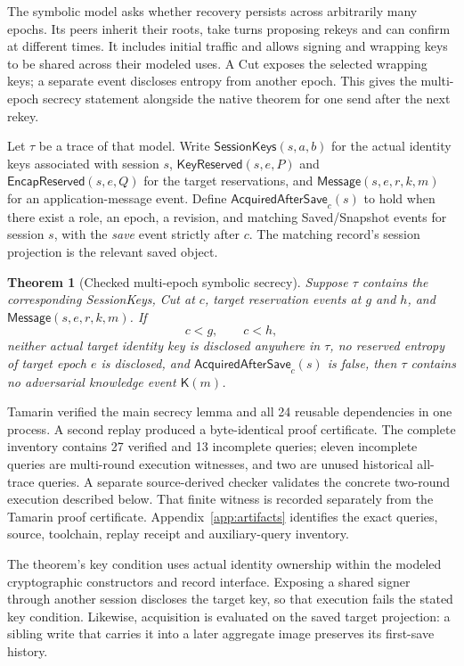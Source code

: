 \documentclass[pdflatex]{sn-jnl}
\theoremstyle{thmstyleone}
\newtheorem{theorem}{Theorem}[section]
\theoremstyle{thmstylethree}
\theoremstyle{thmstyletwo}
\begin{document}
The symbolic model asks whether recovery persists across arbitrarily
many epochs. Its peers inherit their roots, take turns proposing rekeys
and can confirm at different times. It includes initial traffic and
allows signing and wrapping keys to be shared across their modeled
uses. A \textsf{Cut} exposes the selected wrapping keys; a separate
event discloses entropy from another epoch. This gives the multi-epoch
secrecy statement alongside the native theorem for one send after the
next rekey.

Let $\tau$ be a trace of that model. Write
$\mathsf{SessionKeys}(s,a,b)$ for the actual identity keys associated with session
$s$, $\mathsf{KeyReserved}(s,e,P)$ and $\mathsf{EncapReserved}(s,e,Q)$ for the
target reservations, and $\mathsf{Message}(s,e,r,k,m)$ for an application-message
event. Define $\mathsf{AcquiredAfterSave}_c(s)$ to hold when there exist a role,
an epoch, a revision, and matching \textsf{Saved}/\textsf{Snapshot} events for
session $s$, with the \emph{save} event strictly after $c$. The matching record's
session projection is the relevant saved object.

\begin{theorem}[Checked multi-epoch symbolic secrecy]
\label{thm:symbolic}
Suppose $\tau$ contains the corresponding \textsf{SessionKeys}, \textsf{Cut}
at $c$, target reservation events at $g$ and $h$, and
$\mathsf{Message}(s,e,r,k,m)$. If
\[
 c<g,\qquad c<h,
\]
neither actual target identity key is disclosed anywhere in $\tau$, no reserved
entropy of target epoch $e$ is disclosed, and
$\mathsf{AcquiredAfterSave}_c(s)$ is false, then $\tau$ contains no adversarial
knowledge event $\mathsf K(m)$.
\end{theorem}

Tamarin verified the main secrecy lemma and all 24 reusable dependencies
in one process. A second replay produced a byte-identical proof certificate.
The complete inventory contains 27 verified and 13 incomplete queries;
eleven incomplete queries are multi-round execution witnesses, and two
are unused historical all-trace queries. A separate source-derived checker
validates the concrete two-round execution described below. That finite
witness is recorded separately from the Tamarin proof certificate.
Appendix~\ref{app:artifacts} identifies the exact queries, source, toolchain,
replay receipt and auxiliary-query inventory.

The theorem's key condition uses actual identity ownership within the modeled
cryptographic constructors and record interface. Exposing a shared signer
through another session discloses the target key, so that execution fails
the stated key condition. Likewise, acquisition is evaluated on the saved
target projection: a sibling write that carries it into
a later aggregate image preserves its first-save history.
\end{document}
